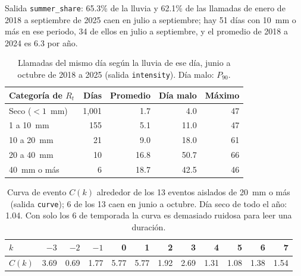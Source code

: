\documentclass[11pt]{article}
\newcommand{\cod}[1]{\nolinkurl{#1}}
\begin{document}
Salida \cod{summer_share}: 65.3\% de la lluvia y 62.1\% de las llamadas de enero de 2018 a septiembre de 2025 caen en julio a septiembre; hay 51 días con 10~mm o más en ese periodo, 34 de ellos en julio a septiembre, y el promedio de 2018 a 2024 es 6.3 por año.

\begin{table}[!htbp]
  \centering
  \small
  \caption{Llamadas del mismo día según la lluvia de ese día, junio a octubre de 2018 a 2025 (salida \cod{intensity}). Día malo: $P_{90}$.}
  \label{tab:n9-intensidad}
  \begin{tabular}{lrrrr}
    \toprule
    Categoría de $R_t$ & Días & Promedio & Día malo & Máximo \\
    \midrule
    Seco ($<1$~mm) & 1,001 & 1.7 & 4.0 & 47 \\
    1 a 10~mm & 155 & 5.1 & 11.0 & 47 \\
    10 a 20~mm & 21 & 9.0 & 18.0 & 61 \\
    20 a 40~mm & 10 & 16.8 & 50.7 & 66 \\
    40~mm o más & 6 & 18.7 & 42.5 & 46 \\
    \bottomrule
  \end{tabular}
\end{table}

\begin{table}[!htbp]
  \centering
  \small
  \caption{Curva de evento $C(k)$ alrededor de los 13 eventos aislados de 20~mm o más (salida \cod{curve}); 6 de los 13 caen en junio a octubre. Día seco de todo el año: 1.04. Con solo los 6 de temporada la curva es demasiado ruidosa para leer una duración.}
  \label{tab:n9-curva}
  \begin{tabular}{lrrrrrrrrrrr}
    \toprule
    $k$ & $-3$ & $-2$ & $-1$ & 0 & 1 & 2 & 3 & 4 & 5 & 6 & 7 \\
    \midrule
    $C(k)$ & 3.69 & 0.69 & 1.77 & 5.77 & 5.77 & 1.92 & 2.69 & 1.31 & 1.08 & 1.38 & 1.54 \\
    \bottomrule
  \end{tabular}
\end{table}
\end{document}

